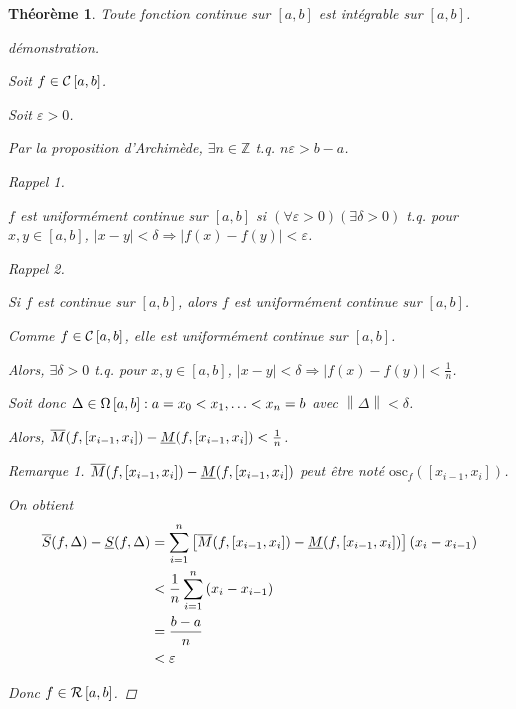 \documentclass{report}
\newcommand*{\norme}[1]{\left\| #1 \right\|}
\newcommand*{\abs}[1]{\left| #1 \right|}
\newcommand*{\eps}{\varepsilon}
\newcommand*{\entiers}{\mathbb{Z}}
\newtheorem*{thm}{Th\'eor\`eme}
\theoremstyle{definition}
\theoremstyle{remark}
\newtheorem*{rema}{Remarque}
\newtheorem*{rapp}{Rappel}
\begin{document}
	\begin{thm}
		Toute fonction continue sur $[a,b]$ est int\'egrable sur $[a,b]$.
		\begin{proof}[d\'emonstration]~

			Soit $f \in \continue$.

			Soit $\eps>0$.

			Par la proposition d'Archim\`ede, $\exists n\in\entiers$ t.q. $n\eps>b-a$.

			\begin{rapp}~

				$f$ est uniform\'ement continue sur $[a,b]$ si $\left( \forall\eps>0 \right) \left( \exists\delta>0 \right)$ t.q. pour $x,y \in [a,b]$, $\abs{x-y}<\delta \Rightarrow \abs{f(x)-f(y)}<\eps$.
			\end{rapp}
			\begin{rapp}~

				Si $f$ est continue sur $[a,b]$, alors $f$ est uniform\'ement continue sur $[a,b]$.
			\end{rapp}

			Comme $f \in \continue$, elle est uniform\'ement continue sur $[a,b]$.

			Alors, $\exists\delta>0$ t.q. pour $x,y \in [a,b]$, $\abs{x-y}<\delta \Rightarrow \abs{f(x)-f(y)}<\frac{1}{n}$.

			Soit donc $\Delta \in \partitions: a=x_0<x_1,\dotsc<x_n=b$ avec $\norme{\Delta}<\delta$.

			Alors, $\msup{f}[\left[ x_{i-1},x_i \right]] - \minf{f}[\left[ x_{i-1},x_i \right]]<\frac{1}{n}$.
			\begin{rema}
				$\msup{f}[\left[ x_{i-1},x_i \right]] - \minf{f}[\left[ x_{i-1},x_i \right]]$ peut \^etre not\'e $\mathrm{osc}_f(\left[ x_{i-1},x_i \right])$.
			\end{rema}

			On obtient
			\begin{align*}
				\ssup{f}-\sinf{f}&= \sum_{i=1}^{n}\left[ \msup{f}[\left[ x_{i-1},x_i \right]] - \minf{f}[\left[ x_{i-1},x_i \right]] \right] \left( x_i-x_{i-1} \right)\\
				&< \dfrac{1}{n} \sum_{i=1}^{n}\left( x_i-x_{i-1} \right)\\
				&=\dfrac{b-a}{n}\\
				&< \eps
			\end{align*}

			Donc $f \in \riemann$.
		\end{proof}
	\end{thm}
\end{document}
